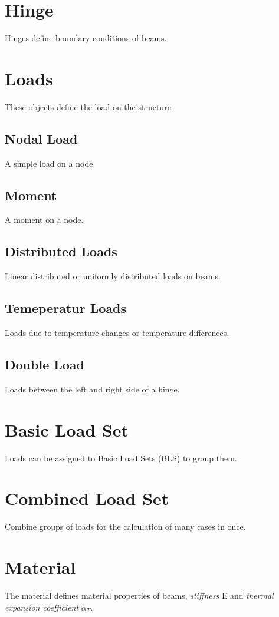 \documentclass[a4paper,11pt]{report}
\begin{document}
\section{Hinge}
Hinges define boundary conditions of beams. 

\section{Loads}
These objects define the load on the structure.

\subsection{Nodal Load}
A simple load on a node.

\subsection{Moment}
A moment on a node.

\subsection{Distributed Loads}
Linear distributed or uniformly distributed loads on beams.

\subsection{Temeperatur Loads}
Loads due to temperature changes or temperature differences.
 
\subsection{Double Load} 
Loads between the left and right side of a hinge.

\section{Basic Load Set}
Loads can be assigned to Basic Load Sets (BLS) to group them.

\section{Combined Load Set}
Combine groups of loads for the calculation of many cases in once.

\section{Material}
The material defines material properties of beams, \textit{stiffness} E and \textit{thermal expansion coefficient} $\alpha_T$.
\end{document}
